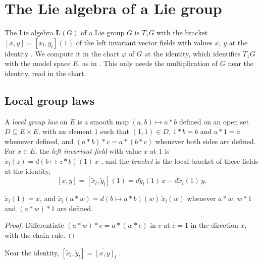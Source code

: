 \chapter{The Lie algebra of a Lie group}
\label{chap:liealgebra}

The Lie algebra $\mathbf{L}(G)$ of a Lie group $G$ is $T_1 G$ with the bracket
$[x, y] = [x_l, y_l](1)$ of the left invariant vector fields with values $x$, $y$ at the
identity \cite[Definition 5.1.6]{GN26}. We compute it in the chart $\varphi$ of $G$ at the
identity, which identifies $T_1 G$ with the model space $E$, as in \cite[(5.5)]{GN26}. This only
needs the multiplication of $G$ near the identity, read in the chart.

\section{Local group laws}

\begin{definition}
  \label{def:local-group-law}
  \leanok
  A \emph{local group law} on $E$ is a smooth map $(a, b) \mapsto a * b$ defined on an open set
  $D \subseteq E \times E$, with an element $1$ such that $(1, 1) \in D$, $1 * b = b$ and
  $a * 1 = a$ whenever defined, and $(a * b) * c = a * (b * c)$ whenever both sides are
  defined. For $x \in E$, the \emph{left invariant field} with value $x$ at $1$ is
  $\tilde x_l(z) = d(b \mapsto z * b)(1)\,x$ \cite[(5.4)]{GN26}, and the \emph{bracket} is the
  local bracket of these fields at the identity,
  \[
    [x, y] = [\tilde x_l, \tilde y_l](1) = d\tilde y_l(1)\,x - d\tilde x_l(1)\,y .
  \]
\end{definition}

\begin{lemma}
  \label{lem:xl-mul}
  \leanok
  $\tilde x_l(1) = x$, and $\tilde x_l(a * w) = d(b \mapsto a * b)(w)\,\tilde x_l(w)$
  whenever $a * w$, $w * 1$ and $(a * w) * 1$ are defined.
\end{lemma}

\begin{proof}
  \leanok
  Differentiate $(a * w) * c = a * (w * c)$ in $c$ at $c = 1$ in the direction $x$, with the
  chain rule.
\end{proof}

\begin{proposition}
  \label{prop:local-bracket-xl}
  \leanok
  Near the identity, $[\tilde x_l, \tilde y_l] = \widetilde{[x, y]}_l$ \cite[(5.3)]{GN26}.
\end{proposition}

